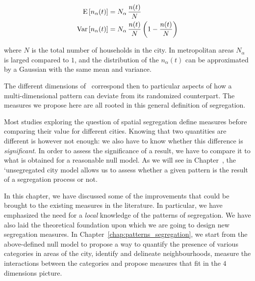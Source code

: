 \begin{align}
    \begin{split}
	\mathrm{E} \left[ n_\alpha(t) \right] &= N_\alpha\,\frac{n(t)}{N} \\
	\mathrm{Var} \left[ n_\alpha(t) \right] &= N_\alpha\,\frac{n(t)}{N} \left( 1 - \frac{n(t)}{N}  \right) 
    \end{split}
\end{align}

where $N$ is the total number of households in the city. In metropolitan areas
$N_\alpha$ is larged compared to $1$, and the distribution of the $n_\alpha(t)$
can be approximated by a Gaussian with the same mean and variance.

The different dimensions of~\cite{Massey:1988,Reardon:2004} correspond then to
particular aspects of how a multi-dimensional pattern can deviate from its
randomized counterpart. The measures we propose here are all rooted in this
general definition of segregation.

Most studies exploring the question of spatial segregation define measures
before comparing their value for different cities. Knowing that two quantities
are different is however not enough: we also have to know whether this
difference is {\em significant}. In order to assess the significance of a
result, we have to compare it to what is obtained for a reasonable null model.
As we will see in Chapter~\cite{chap:patterns_segregation}, the 
`unsegregated city model allows us to assess whether a given pattern is
the result of a segregation process or not.\\

\bigskip

In this chapter, we have discussed some of the improvements that could be
brought to the existing measures in the literature. In particular, we have
emphasized the need for a \emph{local} knowledge of the patterns of segregation.
We have also laid the theoretical foundation upon which we are going to design
new segregation measures.
In Chapter~\ref{chap:patterns_segregation}, we start from the above-defined null
model to propose a way to quantify the presence of various categories in areas
of the city, identify and delineate neighbourhoods, measure the interactions
between the categories and propose measures that fit in the $4$ dimensions
picture.
